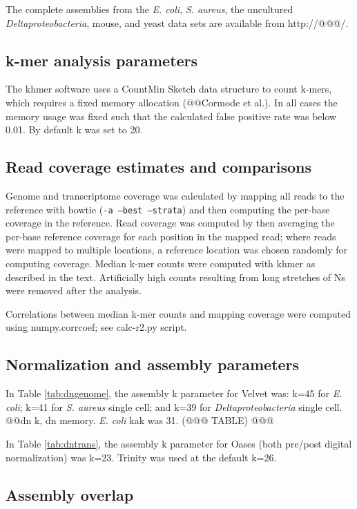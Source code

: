 \documentclass[10pt]{article}
\begin{document}
The complete assemblies from the {\em E. coli}, {\em S. aureus}, the uncultured
{\em Deltaproteobacteria}, mouse, and yeast data sets are available from
http://@@@/.

\subsection*{k-mer analysis parameters}

The khmer software uses a CountMin Sketch data structure to count k-mers,
which requires a fixed memory allocation (@@Cormode et al.).  In all cases
the memory usage was fixed such that the calculated false positive rate was
below 0.01.  By default k was set to 20.

\subsection*{Read coverage estimates and comparisons}

Genome and transcriptome coverage was calculated by mapping all reads
to the reference with bowtie ({\tt -a --best --strata}) and then
computing the per-base coverage in the reference.  Read coverage was
computed by then averaging the per-base reference coverage for each
position in the mapped read; where reads were mapped to multiple
locations, a reference location was chosen randomly for computing
coverage.  Median k-mer counts were computed with khmer as described
in the text.  Artificially high counts resulting from long stretches
of Ns were removed after the analysis.

Correlations between median k-mer counts and mapping coverage were
computed using numpy.corrcoef; see calc-r2.py script.

\subsection*{Normalization and assembly parameters}

In Table \ref{tab:dngenome}, the assembly k parameter for Velvet was:
k=45 for {\em E. coli}; k=41 for {\em S. aureus} single cell; and k=39
for {\em Deltaproteobacteria} single cell.  @@dn k, dn memory.
{\em E. coli} kak was 31.  (@@@ TABLE) @@@

In Table \ref{tab:dntrans}, the assembly k parameter for Oases (both
pre/post digital normalization) was k=23.  Trinity was used at the
default k=26.

\subsection*{Assembly overlap}
\end{document}
